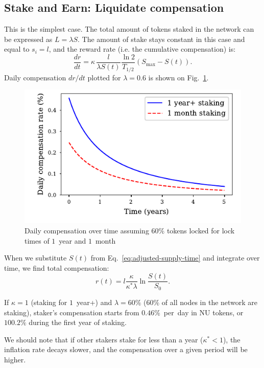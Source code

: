 \documentclass[longbibliography,nofootinbib,twocolumn]{revtex4-1}
\newcommand{\figref}[1]{Fig.~\ref{#1}}
\begin{document}
\subsection{Stake and Earn: Liquidate compensation}

This is the simplest case.
The total amount of tokens staked in the network can be expressed as $L=\lambda S$.
The amount of stake stays constant in this case and equal to $s_i = l$, and the reward rate (i.e. the cumulative compensation) is:
\begin{equation}
    \frac{dr}{dt} =  \kappa\, \frac{l}{\lambda S(t)} \frac{\ln{2}}{T_{1/2}} \left( S_{\max} - S(t)\right).
\end{equation}
Daily compensation $dr/dt$ plotted for $\lambda=0.6$ is shown on \figref{fig:daily-compensation}.

\begin{figure}
    \includegraphics[width=\columnwidth]{pdf/daily-compensation.pdf}
    \caption{Daily compensation over time assuming $60\%$ tokens locked for lock times of $1$~year and $1$~month}
    \label{fig:daily-compensation}
\end{figure}

When we substitute $S(t)$ from Eq.~\ref{eq:adjusted-supply-time} and integrate over time, we find total compensation:
\begin{equation}
    r(t) = l \frac{\kappa}{\kappa^* \lambda} \ln\frac{S(t)}{S_0}.
\end{equation}

If $\kappa=1$ (staking for $1$~year+) and $\lambda=60\%$ ($60\%$ of all nodes in the network are staking),
staker's compensation starts from $0.46\%$~per~day in NU tokens,
or $100.2\%$ during the first year of staking.

We should note that if other stakers stake for less than a year ($\kappa^* < 1$), the inflation rate decays slower, and the compensation over a given period
will be higher.
\end{document}
